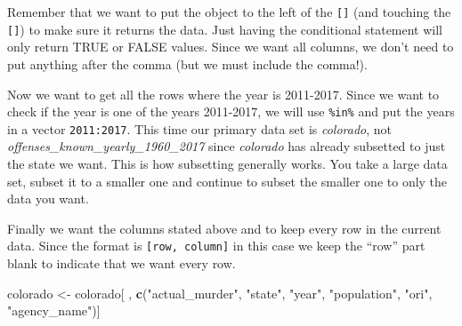 \documentclass[
  12pt,
]{book}
\newenvironment{Shaded}{\begin{snugshade}}{\end{snugshade}}
\newcommand{\DecValTok}[1]{\textcolor[rgb]{0.06,0.06,0.06}{#1}}
\newcommand{\KeywordTok}[1]{\textcolor[rgb]{0.27,0.27,0.27}{\textbf{#1}}}
\newcommand{\NormalTok}[1]{#1}
\newcommand{\OperatorTok}[1]{\textcolor[rgb]{0.43,0.43,0.43}{\textbf{#1}}}
\newcommand{\StringTok}[1]{\textcolor[rgb]{0.5,0.5,0.5}{#1}}
\begin{document}
Remember that we want to put the object to the left of the \texttt{{[}{]}} (and touching the \texttt{{[}{]}}) to make sure it returns the data. Just having the conditional statement will only return TRUE or FALSE values. Since we want all columns, we don't need to put anything after the comma (but we must include the comma!).

\begin{Shaded}
\end{Shaded}

Now we want to get all the rows where the year is 2011-2017. Since we want to check if the year is one of the years 2011-2017, we will use \texttt{\%in\%} and put the years in a vector \texttt{2011:2017}. This time our primary data set is \emph{colorado}, not \emph{offenses\_known\_yearly\_1960\_2017} since \emph{colorado} has already subsetted to just the state we want. This is how subsetting generally works. You take a large data set, subset it to a smaller one and continue to subset the smaller one to only the data you want.

\begin{Shaded}
\end{Shaded}

Finally we want the columns stated above and to keep every row in the current data. Since the format is \texttt{{[}row,\ column{]}} in this case we keep the ``row'' part blank to indicate that we want every row.

\begin{Shaded}
\begin{Highlighting}[]
\NormalTok{colorado \textless{}{-}}\StringTok{ }\NormalTok{colorado[ , }\KeywordTok{c}\NormalTok{(}\StringTok{"actual\_murder"}\NormalTok{, }\StringTok{"state"}\NormalTok{, }\StringTok{"year"}\NormalTok{, }\StringTok{"population"}\NormalTok{, }\StringTok{"ori"}\NormalTok{, }\StringTok{"agency\_name"}\NormalTok{)]}
\end{Highlighting}
\end{Shaded}
\end{document}

